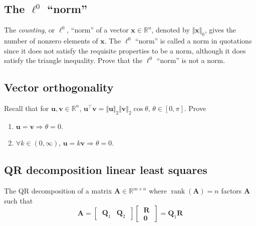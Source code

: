 \documentclass{article}
\numberwithin{equation}{section}
\begin{document}
\subsection{The $ \ell^0 $ ``norm''}

The \textit{counting}, or $ \ell^0 $, ``norm'' of a vector $ \mathbf{x} \in
\mathbb{R}^n $, denoted by $ \Vert\mathbf{x}\Vert_0 $, gives the number of
nonzero elements of $ \mathbf{x} $. The $ \ell^0 $ ``norm'' is called a norm
in quotations since it does not satisfy the requisite properties to be a norm,
although it does satisfy the triangle inequality. Prove that the $ \ell^0 $
``norm'' is not a norm.

\subsection{Vector orthogonality}

Recall that for $ \mathbf{u}, \mathbf{v} \in \mathbb{R}^n $,
$ \mathbf{u}^\top\mathbf{v} = \Vert\mathbf{u}\Vert_2\Vert\mathbf{v}\Vert_2
\cos\theta $, $ \theta \in [0, \pi] $. Prove
\begin{enumerate}[label = \alph*.]
    \item
    $ \mathbf{u} = \mathbf{v} \Rightarrow \theta = 0 $.

    \item
    $ \forall k \in (0, \infty) $, $ \mathbf{u} = k\mathbf{v} \Rightarrow
    \theta = 0 $.
\end{enumerate}

\medskip

\subsection{QR decomposition linear least squares}

The QR decomposition of a matrix $ \mathbf{A} \in \mathbb{R}^{m \times n} $
where $ \operatorname{rank}(\mathbf{A}) = n $ factors $ \mathbf{A} $ such that
\cite{bv_convex_opt}
\begin{equation*}
    \mathbf{A} = \begin{bmatrix} \ \mathbf{Q}_1 & \mathbf{Q}_2 \ \end{bmatrix}
    \begin{bmatrix} \ \mathbf{R} \ \\ \ \mathbf{0} \ \end{bmatrix}
     = \mathbf{Q}_1\mathbf{R}
\end{equation*}
\end{document}
